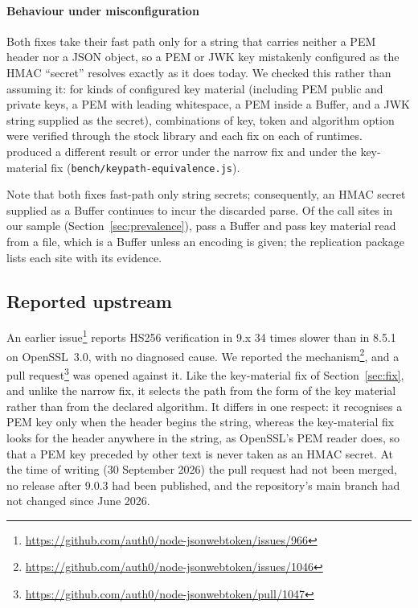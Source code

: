 \documentclass[preprint,12pt,authoryear]{elsarticle}
\newcommand{\StatusDate}{30 September 2026}
\begin{document}
\paragraph{Behaviour under misconfiguration} Both fixes take their fast path
only for a string that carries neither a PEM header nor a JSON object, so a PEM
or JWK key mistakenly configured as the HMAC ``secret'' resolves exactly as it
does today. We checked this rather than assuming it: for \EquivKeyKinds{} kinds
of configured key material (including PEM public and private keys, a PEM with
leading whitespace, a PEM inside a Buffer, and a JWK string supplied as the
secret), \EquivCasesPerRuntime{} combinations of key, token and algorithm option
were verified through the stock library and each fix on each of
\EquivRuntimes{} runtimes. \EquivDiffs{} produced a different result or error
under the narrow fix and \EquivDiffsKeyonly{} under the key-material fix
(\texttt{bench/keypath-equivalence.js}).

Note that both fixes fast-path only string secrets; consequently, an HMAC
secret supplied as a Buffer continues to incur the discarded parse. Of the
\SampleCallSites{} call sites in our sample (Section~\ref{sec:prevalence}),
\SampleBuffer{} pass a Buffer and \SampleFileContents{} pass key material read
from a file, which is a Buffer unless an encoding is given; the replication
package lists each site with its evidence.

\subsection{Reported upstream}\label{sec:upstream}

An earlier issue\footnote{\url{https://github.com/auth0/node-jsonwebtoken/issues/966}}
reports HS256 verification in 9.x 34 times slower than in 8.5.1 on OpenSSL~3.0,
with no diagnosed cause. We reported the
mechanism\footnote{\url{https://github.com/auth0/node-jsonwebtoken/issues/1046}},
and a pull request\footnote{\url{https://github.com/auth0/node-jsonwebtoken/pull/1047}}
was opened against it. Like the key-material fix of Section~\ref{sec:fix},
and unlike the narrow fix, it selects the path from the form of the key
material rather than from the declared algorithm. It differs in one respect: it
recognises a PEM key only when the header begins the string, whereas the
key-material fix looks for the header anywhere in the string, as OpenSSL's PEM
reader does, so that a PEM key preceded by other text is never taken as an
HMAC secret.
At the time of writing (\StatusDate) the pull request had not been merged, no
release after 9.0.3 had been published, and the repository's main branch had
not changed since June 2026.
\end{document}
